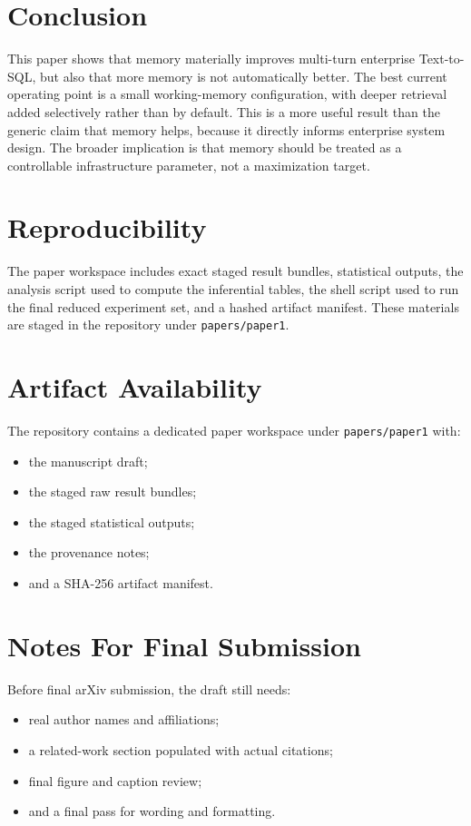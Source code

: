 \documentclass[11pt]{article}
\begin{document}
\section{Conclusion}
This paper shows that memory materially improves multi-turn enterprise Text-to-SQL, but also that more memory is not automatically better. The best current operating point is a small working-memory configuration, with deeper retrieval added selectively rather than by default. This is a more useful result than the generic claim that memory helps, because it directly informs enterprise system design. The broader implication is that memory should be treated as a controllable infrastructure parameter, not a maximization target.

\section{Reproducibility}
The paper workspace includes exact staged result bundles, statistical outputs, the analysis script used to compute the inferential tables, the shell script used to run the final reduced experiment set, and a hashed artifact manifest. These materials are staged in the repository under \texttt{papers/paper1}.

\appendix

\section{Artifact Availability}
The repository contains a dedicated paper workspace under \texttt{papers/paper1} with:
\begin{itemize}[leftmargin=1.5em]
  \item the manuscript draft;
  \item the staged raw result bundles;
  \item the staged statistical outputs;
  \item the provenance notes;
  \item and a SHA-256 artifact manifest.
\end{itemize}

\section{Notes For Final Submission}
Before final arXiv submission, the draft still needs:
\begin{itemize}[leftmargin=1.5em]
  \item real author names and affiliations;
  \item a related-work section populated with actual citations;
  \item final figure and caption review;
  \item and a final pass for wording and formatting.
\end{itemize}



\end{document}
